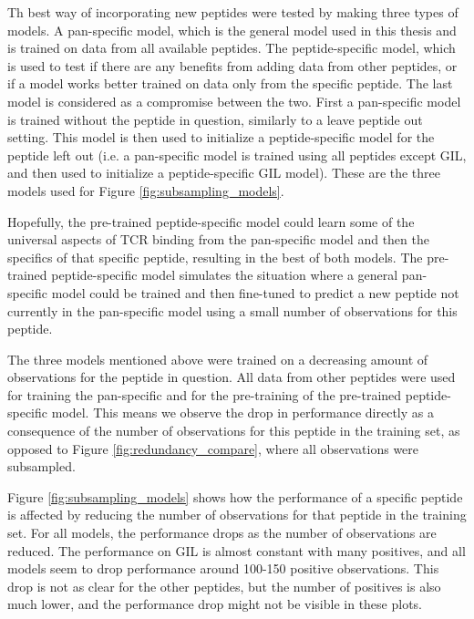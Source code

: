 Th best way of incorporating new peptides were tested by making three types of models. A pan-specific model, which is the general model used in this thesis and is trained on data from all available peptides. The peptide-specific model, which is used to test if there are any benefits from adding data from other peptides, or if a model works better trained on data only from the specific peptide. The last model is considered as a compromise between the two. First a pan-specific model is trained without the peptide in question, similarly to a leave peptide out setting. This model is then used to initialize a peptide-specific model for the peptide left out (i.e. a pan-specific model is trained using all peptides except GIL, and then used to initialize a peptide-specific GIL model). These are the three models used for Figure \ref{fig:subsampling_models}.

Hopefully, the pre-trained peptide-specific model could learn some of the universal aspects of TCR binding from the pan-specific model and then the specifics of that specific peptide, resulting in the best of both models. The pre-trained peptide-specific model simulates the situation where a general pan-specific model could be trained and then fine-tuned to predict a new peptide not currently in the pan-specific model using a small number of observations for this peptide.

The three models mentioned above were trained on a decreasing amount of observations for the peptide in question. All data from other peptides were used for training the pan-specific and for the pre-training of the pre-trained peptide-specific model. This means we observe the drop in performance directly as a consequence of the number of observations for this peptide in the training set, as opposed to Figure \ref{fig:redundancy_compare}, where all observations were subsampled.

Figure \ref{fig:subsampling_models} shows how the performance of a specific peptide is affected by reducing the number of observations for that peptide in the training set.  For all models, the performance drops as the number of observations are reduced. The performance on GIL is almost constant with many positives, and all models seem to drop performance around 100-150 positive observations. This drop is not as clear for the other peptides, but the number of positives is also much lower, and the performance drop might not be visible in these plots.

